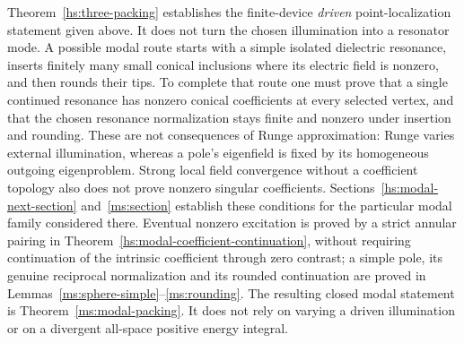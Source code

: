 \begin{remark}
\label{hs:three-modal-gap}
Theorem~\ref{hs:three-packing} establishes the finite-device \emph{driven}
point-localization statement given above.  It does not turn the chosen
illumination into a resonator mode.  A possible modal route starts
with a simple isolated dielectric resonance, inserts finitely many
small conical inclusions where its electric field is nonzero, and
then rounds their tips.  To complete that route one must prove
that a single continued resonance has nonzero conical coefficients
at every selected vertex, and that the chosen resonance normalization
stays finite and nonzero under insertion and rounding.  These are
not consequences of Runge approximation: Runge varies external
illumination, whereas a pole's eigenfield is fixed by its homogeneous
outgoing eigenproblem.  Strong local field convergence without a
coefficient topology also does not prove nonzero singular coefficients.
Sections~\ref{hs:modal-next-section} and~\ref{ms:section} establish
these conditions for the particular modal family considered there.
Eventual nonzero excitation
is proved by a strict annular pairing in
Theorem~\ref{hs:modal-coefficient-continuation}, without requiring
continuation of the intrinsic coefficient through zero contrast; a simple pole,
its genuine reciprocal normalization and its rounded continuation
are proved in Lemmas~\ref{ms:sphere-simple}--\ref{ms:rounding}.
The resulting closed modal statement is
Theorem~\ref{ms:modal-packing}.  It does not rely on varying a driven
illumination or on a divergent all-space positive energy integral.
\end{remark}
